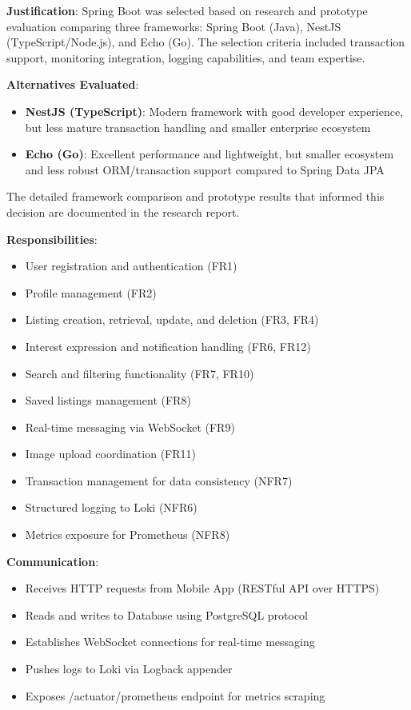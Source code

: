 \textbf{Justification}:
Spring Boot was selected based on research and prototype evaluation comparing three frameworks: Spring Boot (Java), NestJS (TypeScript/Node.js), and Echo (Go). The selection criteria included transaction support, monitoring integration, logging capabilities, and team expertise.

\textbf{Alternatives Evaluated}:
\begin{itemize}
    \item \textbf{NestJS (TypeScript)}: Modern framework with good developer experience, but less mature transaction handling and smaller enterprise ecosystem
    \item \textbf{Echo (Go)}: Excellent performance and lightweight, but smaller ecosystem and less robust ORM/transaction support compared to Spring Data JPA
\end{itemize}

The detailed framework comparison and prototype results that informed this decision are documented in the research report.

\textbf{Responsibilities}:
\begin{itemize}
    \item User registration and authentication (FR1)
    \item Profile management (FR2)
    \item Listing creation, retrieval, update, and deletion (FR3, FR4)
    \item Interest expression and notification handling (FR6, FR12)
    \item Search and filtering functionality (FR7, FR10)
    \item Saved listings management (FR8)
    \item Real-time messaging via WebSocket (FR9)
    \item Image upload coordination (FR11)
    \item Transaction management for data consistency (NFR7)
    \item Structured logging to Loki (NFR6)
    \item Metrics exposure for Prometheus (NFR8)
\end{itemize}

\textbf{Communication}:
\begin{itemize}
    \item Receives HTTP requests from Mobile App (RESTful API over HTTPS)
    \item Reads and writes to Database using PostgreSQL protocol
    \item Establishes WebSocket connections for real-time messaging
    \item Pushes logs to Loki via Logback appender
    \item Exposes /actuator/prometheus endpoint for metrics scraping
\end{itemize}

